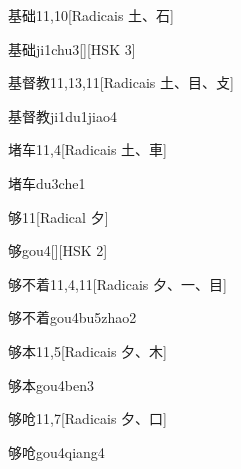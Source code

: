 \begin{entry}{基础}{11,10}[Radicais ⼟、⽯]
  \begin{phonetics}{基础}{ji1chu3}[][HSK 3]
  \end{phonetics}
\end{entry}

\begin{entry}{基督教}{11,13,11}[Radicais ⼟、⽬、⽁]
  \begin{phonetics}{基督教}{ji1du1jiao4}
  \end{phonetics}
\end{entry}

\begin{entry}{堵车}{11,4}[Radicais ⼟、⾞]
  \begin{phonetics}{堵车}{du3che1}
  \end{phonetics}
\end{entry}

\begin{entry}{够}{11}[Radical ⼣]
  \begin{phonetics}{够}{gou4}[][HSK 2]
  \end{phonetics}
\end{entry}

\begin{entry}{够不着}{11,4,11}[Radicais ⼣、⼀、⽬]
  \begin{phonetics}{够不着}{gou4bu5zhao2}
  \end{phonetics}
\end{entry}

\begin{entry}{够本}{11,5}[Radicais ⼣、⽊]
  \begin{phonetics}{够本}{gou4ben3}
  \end{phonetics}
\end{entry}

\begin{entry}{够呛}{11,7}[Radicais ⼣、⼝]
  \begin{phonetics}{够呛}{gou4qiang4}
  \end{phonetics}
\end{entry}

